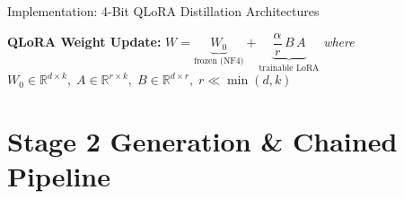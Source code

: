 \documentclass[aspectratio=169,10pt]{beamer}
\begin{document}
\begin{frame}{Implementation: 4-Bit QLoRA Distillation Architectures}
  \vspace{2pt}
  \begin{center}
    \scriptsize
    \textbf{QLoRA Weight Update:}\quad
    $\displaystyle W = \underbrace{W_0}_{\text{frozen (NF4)}} + \underbrace{\dfrac{\alpha}{r}\,B\,A}_{\text{trainable LoRA}}$
    \quad\textit{where}\quad $W_0\!\in\!\mathbb{R}^{d\times k},\;
      A\!\in\!\mathbb{R}^{r\times k},\;B\!\in\!\mathbb{R}^{d\times r},\;
      r \ll \min(d,k)$
  \end{center}
\end{frame}

\section{Stage 2 Generation \& Chained Pipeline}
\end{document}
